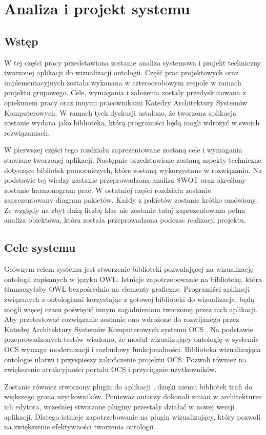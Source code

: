 \chapter{Analiza i projekt systemu}
\section{Wstęp}
W tej części pracy przedstawiona zostanie analiza systemowa i  projekt techniczny tworzonej aplikacji do wizualizacji ontologii. Część prac projektowych oraz implementacyjnych 
została wykonana w czteroosobowym zespole w ramach projektu grupowego.  Cele, wymagania i założenia zostały przedyskutowana z opiekunem pracy oraz innymi pracownikami 
Katedry Architektury Systemów Komputerowych. W ramach tych dyskusji ustalono, że tworzona aplikacja zostanie wydana jako biblioteka, którą programiści będą mogli 
wdrożyć w swoich rozwiązaniach. 
\par
W pierwszej części tego rozdziału zaprezentowane zostaną cele i wymagania stawiane tworzonej aplikacji. Następnie przedstawione zostaną aspekty techniczne dotyczące 
bibliotek pomocniczych, które zostaną wykorzystane w rozwiązaniu. Na podstawie tej wiedzy zastanie przeprowadzona analiza SWOT oraz określony zostanie harmonogram prac. 
W ostatniej części rozdziału zostanie zaprezentowany diagram pakietów. Każdy z pakietów zostanie krótko omówiony. Ze względy na zbyt dużą liczbę klas nie zostanie tutaj 
zaprezentowana pełna analiza obiektowa, która została przeprowadzona podczas realizacji projektu.
  
\section{Cele systemu}
Głównym celem systemu jest stworzenie biblioteki pozwalającej na wizualizację ontologii zapisanych w języku OWL. Istnieje zapotrzebowanie na bibliotekę, która 
tłumaczyłaby OWL bezpośrednio na elementy graficzne.  Programiści aplikacji związanych z ontologiami korzystając z gotowej biblioteki do wizualizacja, 
będą mogli więcej czasu poświęcić innym zagadnieniom tworzonej przez nich aplikacji.  Aby przetestować rozwiązanie zostanie ono wdrożone do 
rozwijanego przez Katedrę Architektury Systemów Komputerowych systemu OCS \cite{jankowski, boinski}. Na podstawie przeprowadzonych testów wiadomo, że moduł wizualizujący 
ontologię w systemie OCS wymaga modernizacji i rozbudowy funkcjonalności. Biblioteka wizualizująca ontologie ułatwi i przyspieszy zakończenie projektu OCS. Pozwoli 
również na zwiększenie atrakcyjności portalu OCS i przyciągnie użytkowników. 
\par
Zostanie również stworzony plugin do aplikacji \protege, dzięki niemu bibliotek trafi do większego grona użytkowników. Ponieważ autorzy \proteges dokonali zmian w architekturze 
ich edytora, wcześniej stworzone pluginy przestały działać w nowej wersji aplikacji. Dlatego istnieje zapotrzebowanie na plugin wizualizujący, który pozwoli na zwiększenie 
efektywności tworzenia ontologii. 

